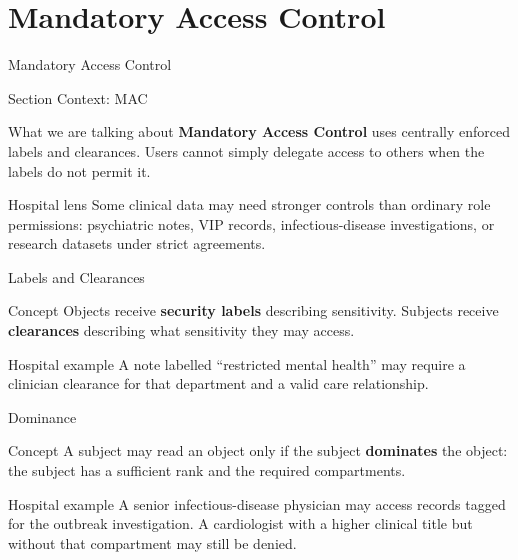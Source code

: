 \documentclass[presentation]{beamer}
\newcommand{\sectiontitleframe}[1]{
\begin{frame}[plain,c]
\begin{center}
{\usebeamerfont{title}\usebeamercolor[fg]{title}#1}
\end{center}
\end{frame}
}
\begin{document}
\section{Mandatory Access Control}
\sectiontitleframe{Mandatory Access Control}

\begin{frame}[c]{Section Context: MAC}
\begin{block}{What we are talking about}
\textbf{Mandatory Access Control} uses centrally enforced labels and clearances. Users cannot
simply delegate access to others when the labels do not permit it.
\end{block}

\begin{exampleblock}{Hospital lens}
Some clinical data may need stronger controls than ordinary role permissions: psychiatric notes,
VIP records, infectious-disease investigations, or research datasets under strict agreements.
\end{exampleblock}
\end{frame}

\begin{frame}[c]{Labels and Clearances}
\begin{block}{Concept}
Objects receive \textbf{security labels} describing sensitivity. Subjects receive
\textbf{clearances} describing what sensitivity they may access.
\end{block}

\begin{exampleblock}{Hospital example}
A note labelled ``restricted mental health'' may require a clinician clearance for that department
and a valid care relationship.
\end{exampleblock}
\end{frame}

\begin{frame}[c]{Dominance}
\begin{block}{Concept}
A subject may read an object only if the subject \textbf{dominates} the object: the subject has a
sufficient rank and the required compartments.
\end{block}

\begin{exampleblock}{Hospital example}
A senior infectious-disease physician may access records tagged for the outbreak investigation.
A cardiologist with a higher clinical title but without that compartment may still be denied.
\end{exampleblock}
\end{frame}
\end{document}
